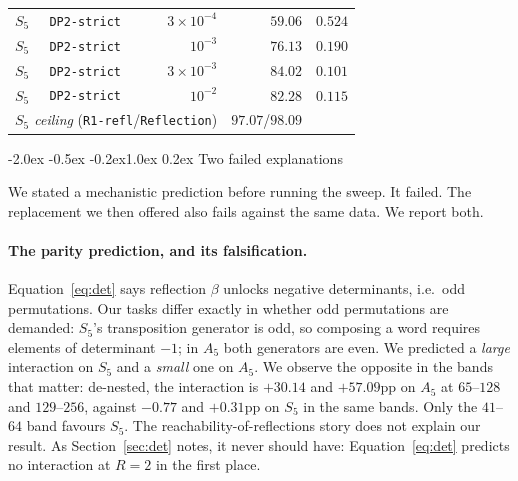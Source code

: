 \documentclass[10pt,twocolumn]{article}
\makeatletter
\renewcommand\section{\@startsection{section}{1}{\z@}%
  {-2.0ex \@plus -0.5ex \@minus -0.2ex}{1.0ex \@plus 0.2ex}%
  {\normalfont\large\bfseries}}
\makeatother
\begin{document}
\begin{table}[t]
\begin{tabular}{llrrr}
$S_5$ & \texttt{DP2-strict} & $3\!\times\!10^{-4}$ & $59.06$ & $0.524$ \\
$S_5$ & \texttt{DP2-strict} & $10^{-3}$            & $76.13$ & $0.190$ \\
$S_5$ & \texttt{DP2-strict} & $3\!\times\!10^{-3}$ & $84.02$ & $0.101$ \\
$S_5$ & \texttt{DP2-strict} & $10^{-2}$            & $82.28$ & $0.115$ \\
\cmidrule(lr){1-5}
\multicolumn{3}{l}{\emph{$S_5$ ceiling} (\texttt{R1-refl}/\texttt{Reflection})}
  & $97.07$/$98.09$ & \\
\bottomrule
\end{tabular}
\end{table}

\section{Two failed explanations}
\label{sec:parity}

We stated a mechanistic prediction before running the sweep. It failed. The
replacement we then offered also fails against the same data. We report both.

\paragraph{The parity prediction, and its falsification.}
Equation~\eqref{eq:det} says reflection $\beta$ unlocks negative determinants,
i.e.\ odd permutations. Our tasks differ exactly in whether odd permutations are
demanded: $S_5$'s transposition generator is odd, so composing a word requires
elements of determinant $-1$; in $A_5$ both generators are even. We predicted a
\emph{large} interaction on $S_5$ and a \emph{small} one on $A_5$. We observe the
opposite in the bands that matter: de-nested, the interaction is $+30.14$ and
$+57.09$pp on $A_5$ at $65$--$128$ and $129$--$256$, against $-0.77$ and
$+0.31$pp on $S_5$ in the same bands. Only the $41$--$64$ band favours $S_5$.
The reachability-of-reflections story does not explain our result. As
Section~\ref{sec:det} notes, it never should have: Equation~\eqref{eq:det}
predicts no interaction at $R=2$ in the first place.
\end{document}
